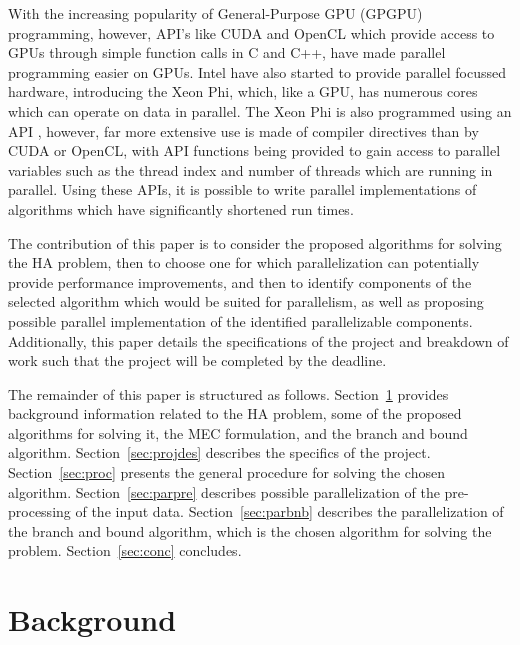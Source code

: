 \documentclass[10pt,twocolumn]{article}
\begin{document}
With the increasing popularity of General-Purpose GPU (GPGPU) programming, however, API's like CUDA
\cite{nvidia:2015} and OpenCL \cite{khronos:2015}
which provide access to GPUs through simple function calls in C and C++, have made parallel programming
easier on GPUs. Intel have also started to provide parallel focussed hardware, introducing the Xeon Phi, which, like 
a GPU, has numerous cores which can operate on data in parallel. The Xeon Phi is also programmed using an API 
\cite{intel:2013}, however, far more extensive use is made of compiler directives than by CUDA or OpenCL, 
with API functions being provided to gain access to parallel variables such as the thread index and number of 
threads which are running in parallel. Using these APIs, it is possible to write parallel implementations of
algorithms which have significantly shortened run times.

The contribution of this paper is to consider the proposed algorithms for solving the HA problem, then to
choose one for which parallelization can potentially provide performance improvements, and then to identify 
components of the selected algorithm which would be suited for parallelism, as well as proposing possible 
parallel implementation of the identified parallelizable components. Additionally, this paper details the
specifications of the project and breakdown of work such that the project will be completed by the deadline.

The remainder of this paper is structured as follows. Section~\ref{sec:bground} provides background
information related to the HA problem, some of the proposed algorithms for solving it, the MEC
formulation, and the branch and bound algorithm. Section~\ref{sec:projdes} describes the specifics of the
project. Section~\ref{sec:proc} presents the general procedure for solving the chosen algorithm. 
Section~\ref{sec:parpre} describes possible parallelization of the pre-processing of the input data. 
Section~\ref{sec:parbnb} describes the parallelization of the branch and bound algorithm, which is the chosen
algorithm for solving the problem. Section~\ref{sec:conc} concludes.


\section{Background} \label{sec:bground}
\end{document}
